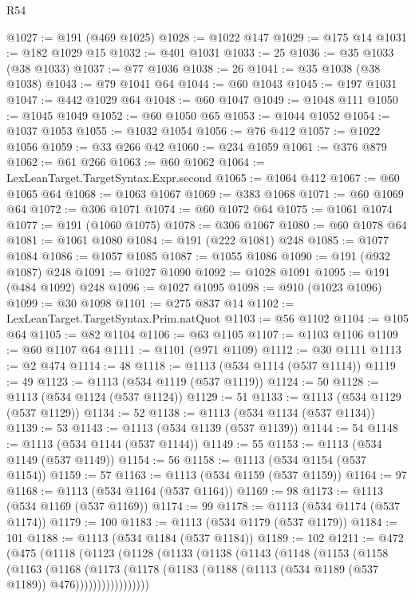\begin{lexlean}{R54}
\begin{coremodule}
{{{{{{{{{{{{{{{{{{{{{{{{{{{{{{{{{{{{{{{{{{{{{{{{{{@1027 := @191 (@469 @1025)
@1028 := @1022 @147
@1029 := @175 @14
@1031 := @182 @1029 @15
@1032 := @401 @1031
@1033 := 25
@1036 := @35 @1033 (@38 @1033)
@1037 := @77 @1036
@1038 := 26
@1041 := @35 @1038 (@38 @1038)
@1043 := @79 @1041 @64
@1044 := @60 @1043
@1045 := @197 @1031
@1047 := @442 @1029 @64
@1048 := @60 @1047
@1049 := @1048 @111
@1050 := @1045 @1049
@1052 := @60 @1050 @65
@1053 := @1044 @1052
@1054 := @1037 @1053
@1055 := @1032 @1054
@1056 := @76 @412
@1057 := @1022 @1056
@1059 := @33 @266 @42
@1060 := @234 @1059
@1061 := @376 @879
@1062 := @61 @266
@1063 := @60 @1062
@1064 := LexLeanTarget.TargetSyntax.Expr.second
@1065 := @1064 @412
@1067 := @60 @1065 @64
@1068 := @1063 @1067
@1069 := @383 @1068
@1071 := @60 @1069 @64
@1072 := @306 @1071
@1074 := @60 @1072 @64
@1075 := @1061 @1074
@1077 := @191 (@1060 @1075)
@1078 := @306 @1067
@1080 := @60 @1078 @64
@1081 := @1061 @1080
@1084 := @191 (@222 @1081) @248
@1085 := @1077 @1084
@1086 := @1057 @1085
@1087 := @1055 @1086
@1090 := @191 (@932 @1087) @248
@1091 := @1027 @1090
@1092 := @1028 @1091
@1095 := @191 (@484 @1092) @248
@1096 := @1027 @1095
@1098 := @910 (@1023 @1096)
@1099 := @30 @1098
@1101 := @275 @837 @14
@1102 := LexLeanTarget.TargetSyntax.Prim.natQuot
@1103 := @56 @1102
@1104 := @105 @64
@1105 := @82 @1104
@1106 := @63 @1105
@1107 := @1103 @1106
@1109 := @60 @1107 @64
@1111 := @1101 (@971 @1109)
@1112 := @30 @1111
@1113 := @2 @474
@1114 := 48
@1118 := @1113 (@534 @1114 (@537 @1114))
@1119 := 49
@1123 := @1113 (@534 @1119 (@537 @1119))
@1124 := 50
@1128 := @1113 (@534 @1124 (@537 @1124))
@1129 := 51
@1133 := @1113 (@534 @1129 (@537 @1129))
@1134 := 52
@1138 := @1113 (@534 @1134 (@537 @1134))
@1139 := 53
@1143 := @1113 (@534 @1139 (@537 @1139))
@1144 := 54
@1148 := @1113 (@534 @1144 (@537 @1144))
@1149 := 55
@1153 := @1113 (@534 @1149 (@537 @1149))
@1154 := 56
@1158 := @1113 (@534 @1154 (@537 @1154))
@1159 := 57
@1163 := @1113 (@534 @1159 (@537 @1159))
@1164 := 97
@1168 := @1113 (@534 @1164 (@537 @1164))
@1169 := 98
@1173 := @1113 (@534 @1169 (@537 @1169))
@1174 := 99
@1178 := @1113 (@534 @1174 (@537 @1174))
@1179 := 100
@1183 := @1113 (@534 @1179 (@537 @1179))
@1184 := 101
@1188 := @1113 (@534 @1184 (@537 @1184))
@1189 := 102
@1211 := @472
    (@475
      (@1118
        (@1123
          (@1128
            (@1133
              (@1138
                (@1143
                  (@1148
                    (@1153
                      (@1158
                        (@1163
                          (@1168
                            (@1173
                              (@1178
                                (@1183 (@1188 (@1113 (@534 @1189 (@537 @1189)) @476)))))))))))))))))
}}}}}}}}}}}}}}}}}}}}}}}}}}}}}}}}}}}}}}}}}}}}}}}}}}
\end{coremodule}
\end{lexlean}
